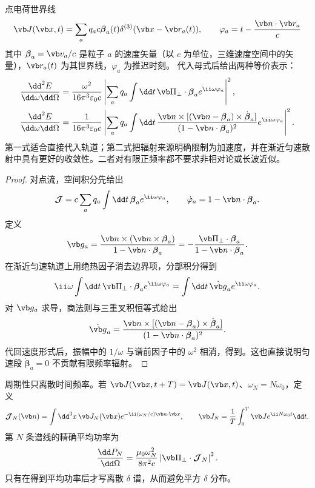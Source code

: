 点电荷世界线
\[
 \vb J(\vb x,t)=\sum_aq_ac\boldsymbol\beta_a(t)
 \delta^{(3)}(\vb x-\vb r_a(t)),
 \qquad
 \varphi_a=t-\frac{\vb n\cdot\vb r_a}{c}
\]
其中 $\boldsymbol\beta_a=\vb v_a/c$ 是粒子 $a$ 的速度矢量（以 $c$ 为单位，三维速度空间中的矢量），$\vb r_a(t)$ 为其世界线，$\varphi_a$ 为推迟时刻。
代入母式后给出两种等价表示：
\begin{align}
 \frac{\dd^2E}{\dd\omega\dd\Omega}
 &=\frac{\omega^2}{16\pi^3\varepsilon_0c}
 \left|\sum_aq_a\int\dd t\,
 \vb\Pi_\perp\cdot\boldsymbol\beta_a e^{\ii\omega\varphi_a}\right|^2,
 \label{eq:phys-rr-point-spectrum-velocity}\\
 \frac{\dd^2E}{\dd\omega\dd\Omega}
 &=\frac{1}{16\pi^3\varepsilon_0c}
 \left|\sum_aq_a\int\dd t\,
 \frac{\vb n\times[(\vb n-\boldsymbol\beta_a)\times
 \dot{\boldsymbol\beta}_a]}
 {(1-\vb n\cdot\boldsymbol\beta_a)^2}
 e^{\ii\omega\varphi_a}\right|^2.
 \label{eq:phys-rr-exact-point-spectrum}
\end{align}
第一式适合直接代入轨道；第二式把辐射来源明确限制为加速度，并在渐近匀速散射中具有更好的收敛性。二者对有限正频率都不要求非相对论或长波近似。

\begin{proof}
对点流，空间积分先给出
\[
 \boldsymbol{\mathcal J}
 =c\sum_aq_a\int\dd t\,\boldsymbol\beta_a e^{\ii\omega\varphi_a},
 \qquad
 \dot\varphi_a=1-\vb n\cdot\boldsymbol\beta_a .
\]
定义
\[
 \vb g_a=\frac{\vb n\times(\vb n\times\boldsymbol\beta_a)}
 {1-\vb n\cdot\boldsymbol\beta_a}
 =-\frac{\vb\Pi_\perp\cdot\boldsymbol\beta_a}
 {1-\vb n\cdot\boldsymbol\beta_a}.
\]
在渐近匀速轨道上用绝热因子消去边界项，分部积分得到
\[
 \ii\omega\int\dd t\,
 \vb\Pi_\perp\cdot\boldsymbol\beta_a e^{\ii\omega\varphi_a}
 =\int\dd t\,\dot{\vb g}_a e^{\ii\omega\varphi_a}.
\]
对 \(\vb g_a\) 求导，商法则与三重叉积恒等式给出
\[
 \dot{\vb g}_a=
 \frac{\vb n\times[(\vb n-\boldsymbol\beta_a)\times
 \dot{\boldsymbol\beta}_a]}
 {(1-\vb n\cdot\boldsymbol\beta_a)^2}.
\]
代回速度形式后，振幅中的 \(1/\omega\) 与谱前因子中的 \(\omega^2\)
相消，得到。这也直接说明匀速段
\(\dot{\boldsymbol\beta}_a=0\) 不贡献有限频率辐射。
\end{proof}

周期性只离散时间频率。若
\(\vb J(\vb x,t+T)=\vb J(\vb x,t)\)、\(\omega_N=N\omega_0\)，定义
\begin{equation}
 \boldsymbol{\mathcal J}_N(\vb n)
 =\int\dd^3x\,\vb J_N(\vb x)
 e^{-\ii(\omega_N/c)\vb n\cdot\vb x},
 \qquad
 \vb J_N=\frac1T\int_0^T\vb J e^{\ii N\omega_0t}\dd t .
 \label{eq:phys-rr-periodic-current-amplitude}
\end{equation}
第 \(N\) 条谱线的精确平均功率为
\begin{equation}
 \frac{\dd P_N}{\dd\Omega}
 =\frac{\mu_0\omega_N^2}{8\pi^2c}
 \left|\vb\Pi_\perp\cdot\boldsymbol{\mathcal J}_N\right|^2 .
 \label{eq:phys-rr-exact-periodic-line-power}
\end{equation}
只有在得到平均功率后才写离散 \(\delta\) 谱，从而避免平方 \(\delta\) 分布。

